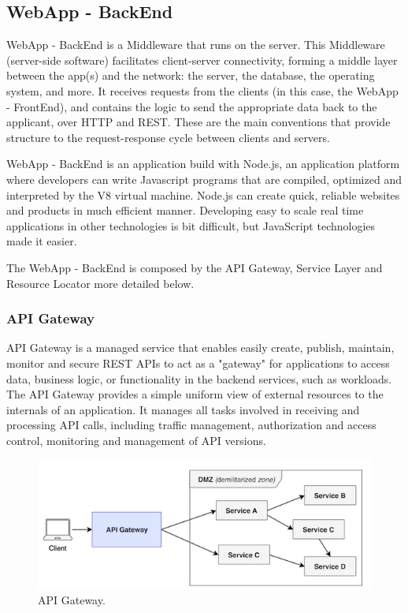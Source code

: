 \subsection{WebApp - BackEnd}\label{sec:WebAppBackEnd}
WebApp - BackEnd is a Middleware that runs on the server. This Middleware (server-side software) facilitates client-server connectivity, forming a middle layer between the app(s) and the network: the server, the database, the operating system, and more. It receives requests from the clients (in this case, the WebApp - FrontEnd), and contains the logic to send the appropriate data back to the applicant, over HTTP and REST.  These are the main conventions that provide structure to the request-response cycle between clients and servers.

WebApp - BackEnd is an application build with Node.js, an application platform where developers can write Javascript programs that are compiled, optimized and interpreted by the V8 virtual machine. Node.js can create quick, reliable websites and products in much efficient manner. Developing easy to scale real time applications in other technologies is bit difficult, but JavaScript technologies made it easier.

The WebApp - BackEnd is composed by the API Gateway, Service Layer and Resource Locator more detailed below.

\subsubsection{API Gateway}\label{sec:APIGateway}
API Gateway is a managed service that enables easily create, publish, maintain, monitor and secure REST APIs to act as a "gateway" for applications to access data, business logic, or functionality in the backend services, such as workloads. The API Gateway provides a simple uniform view of external resources to the internals of an application. It manages all tasks involved in receiving and processing API calls, including traffic management, authorization and access control, monitoring and management of API versions.

\begin{figure}[htbp]
\begin{center}
  \includegraphics[scale=0.75]{images/apigateway.png}
\caption{API Gateway.}
\label{default-regular2}
\end{center}
\end{figure}

